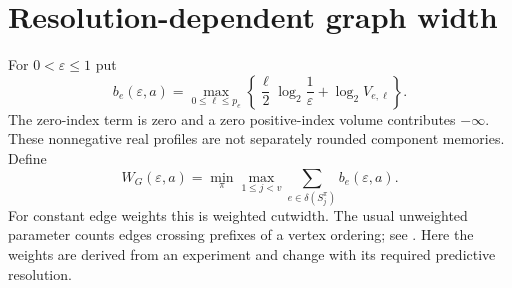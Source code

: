 \section{Resolution-dependent graph width}\label{sec:v25-graph-width}
For $0<\varepsilon\le1$ put
\begin{equation}\label{eq:v25-edge-bits}
 b_e(\varepsilon,a)=\max_{0\le\ell\le p_e}
       \left\{\frac{\ell}{2}\log_2\frac1\varepsilon
                              +\log_2 V_{e,\ell}\right\}.
\end{equation}
The zero-index term is zero and a zero positive-index volume contributes
$-\infty$. These nonnegative real profiles are not separately rounded
component memories. Define
\begin{equation}\label{eq:v25-weighted-width}
 W_G(\varepsilon,a)=\min_\pi\max_{1\le j<v}
                       \sum_{e\in\delta(S_j^\pi)}b_e(\varepsilon,a).
\end{equation}
For constant edge weights this is weighted cutwidth. The usual unweighted
parameter counts edges crossing prefixes of a vertex ordering; see
\cite{AmarilliGroz2025}. Here the weights are derived from an experiment
and change with its required predictive resolution.

